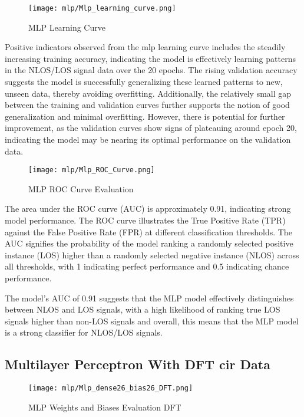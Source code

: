 \begin{figure}[H] 
  \centering
  \texttt{[image: mlp/Mlp\_learning\_curve.png]}
  \caption{MLP Learning Curve}\label{fig:mlp_learning_curve}
\end{figure}

Positive indicators observed from the mlp learning curve includes the steadily increasing training accuracy, indicating the model is effectively learning patterns in the NLOS/LOS signal data over the 20 epochs. The rising validation accuracy suggests the model is successfully generalizing these learned patterns to new, unseen data, thereby avoiding overfitting. Additionally, the relatively small gap between the training and validation curves further supports the notion of good generalization and minimal overfitting. However, there is potential for further improvement, as the validation curves show signs of plateauing around epoch 20, indicating the model may be nearing its optimal performance on the validation data.

\begin{figure}[H] 
  \centering
  \texttt{[image: mlp/Mlp\_ROC\_Curve.png]}
  \caption{MLP ROC Curve Evaluation}\label{fig:mpl_roc_curve}
\end{figure}

The area under the ROC curve (AUC) is approximately 0.91, indicating strong model performance. The ROC curve illustrates the True Positive Rate (TPR) against the False Positive Rate (FPR) at different classification thresholds. The AUC signifies the probability of the model ranking a randomly selected positive instance (LOS) higher than a randomly selected negative instance (NLOS) across all thresholds, with 1 indicating perfect performance and 0.5 indicating chance performance.

The model's AUC of 0.91 suggests that the MLP model effectively distinguishes between NLOS and LOS signals, with a high likelihood of ranking true LOS signals higher than non-LOS signals and overall, this means that the MLP model is a strong classifier for NLOS/LOS signals.

\subsection{Multilayer Perceptron With DFT \acrshort{cir} Data}\label{mlp_visual_dft}

\begin{figure}[H] 
  \centering
  \texttt{[image: mlp/Mlp\_dense26\_bias26\_DFT.png]}
  \caption{MLP Weights and Biases Evaluation DFT}\label{fig:Mlp_dense26_bias26_DFT}
\end{figure}

